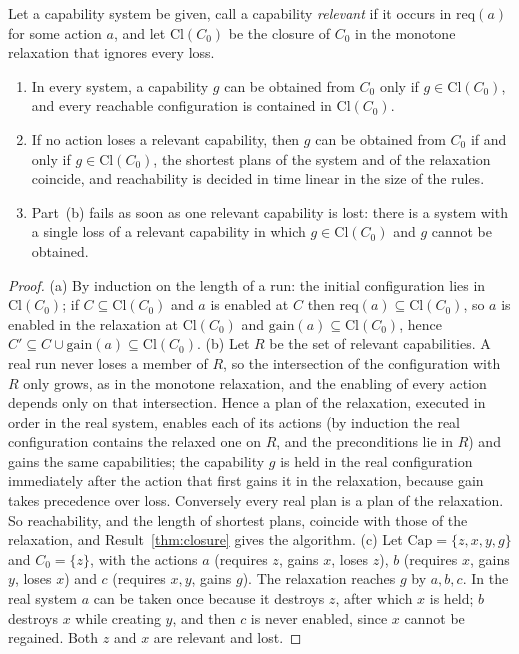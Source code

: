 \begin{newresult}\label{prop:irrelevant-loss}
Let a capability system be given, call a capability \emph{relevant} if it occurs in $\mathrm{req}(a)$ for some action $a$, and let $\mathrm{Cl}(C_0)$ be the closure of $C_0$ in the monotone relaxation that ignores every loss.
\begin{enumerate}[nosep,label=(\alph*)]
  \item In every system, a capability $g$ can be obtained from $C_0$ only if $g\in\mathrm{Cl}(C_0)$, and every reachable configuration is contained in $\mathrm{Cl}(C_0)$.
  \item If no action loses a relevant capability, then $g$ can be obtained from $C_0$ if and only if $g\in\mathrm{Cl}(C_0)$, the shortest plans of the system and of the relaxation coincide, and reachability is decided in time linear in the size of the rules.
  \item Part~(b) fails as soon as one relevant capability is lost: there is a system with a single loss of a relevant capability in which $g\in\mathrm{Cl}(C_0)$ and $g$ cannot be obtained.
\end{enumerate}
\end{newresult}
\begin{proof}
(a) By induction on the length of a run: the initial configuration lies in $\mathrm{Cl}(C_0)$; if $C\subseteq\mathrm{Cl}(C_0)$ and $a$ is enabled at $C$ then $\mathrm{req}(a)\subseteq\mathrm{Cl}(C_0)$, so $a$ is enabled in the relaxation at $\mathrm{Cl}(C_0)$ and $\mathrm{gain}(a)\subseteq\mathrm{Cl}(C_0)$, hence $C'\subseteq C\cup\mathrm{gain}(a)\subseteq\mathrm{Cl}(C_0)$. (b) Let $R$ be the set of relevant capabilities. A real run never loses a member of $R$, so the intersection of the configuration with $R$ only grows, as in the monotone relaxation, and the enabling of every action depends only on that intersection. Hence a plan of the relaxation, executed in order in the real system, enables each of its actions (by induction the real configuration contains the relaxed one on $R$, and the preconditions lie in $R$) and gains the same capabilities; the capability $g$ is held in the real configuration immediately after the action that first gains it in the relaxation, because gain takes precedence over loss. Conversely every real plan is a plan of the relaxation. So reachability, and the length of shortest plans, coincide with those of the relaxation, and Result~\ref{thm:closure} gives the algorithm. (c) Let $\mathrm{Cap}=\{z,x,y,g\}$ and $C_0=\{z\}$, with the actions $a$ (requires $z$, gains $x$, loses $z$), $b$ (requires $x$, gains $y$, loses $x$) and $c$ (requires $x,y$, gains $g$). The relaxation reaches $g$ by $a,b,c$. In the real system $a$ can be taken once because it destroys $z$, after which $x$ is held; $b$ destroys $x$ while creating $y$, and then $c$ is never enabled, since $x$ cannot be regained. Both $z$ and $x$ are relevant and lost.
\end{proof}

